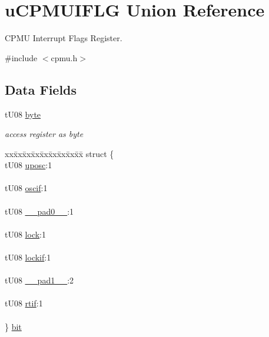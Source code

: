 \hypertarget{unionu_c_p_m_u_i_f_l_g}{}\section{u\+C\+P\+M\+U\+I\+F\+L\+G Union Reference}
\label{unionu_c_p_m_u_i_f_l_g}


C\+P\+M\+U Interrupt Flags Register.  




{\ttfamily \#include $<$cpmu.\+h$>$}

\subsection*{Data Fields}
\begin{DoxyCompactItemize}
\item 
\hypertarget{unionu_c_p_m_u_i_f_l_g_aba308d63db050aed25cfd36c37e41ad4}{}t\+U08 \hyperlink{unionu_c_p_m_u_i_f_l_g_aba308d63db050aed25cfd36c37e41ad4}{byte}\label{unionu_c_p_m_u_i_f_l_g_aba308d63db050aed25cfd36c37e41ad4}

\begin{DoxyCompactList}\small\item\em access register as byte \end{DoxyCompactList}\item 
\hypertarget{unionu_c_p_m_u_i_f_l_g_a461897484614bfd4423042d8157d629d}{}\begin{tabbing}
xx\=xx\=xx\=xx\=xx\=xx\=xx\=xx\=xx\=\kill
struct \{\\
\>tU08 \hyperlink{unionu_c_p_m_u_i_f_l_g_a7e6f05478ab661194263d568807ba978}{uposc}:1\\
\>\\
\>tU08 \hyperlink{unionu_c_p_m_u_i_f_l_g_af5df32b1813ef32f35dc7cb0efcfe78c}{oscif}:1\\
\>\\
\>tU08 \hyperlink{unionu_c_p_m_u_i_f_l_g_aa3e5250d311ceb1525f9adf38f0d7982}{\_\_pad0\_\_}:1\\
\>\\
\>tU08 \hyperlink{unionu_c_p_m_u_i_f_l_g_ad28294208214525c2fd2825248ec58dd}{lock}:1\\
\>\\
\>tU08 \hyperlink{unionu_c_p_m_u_i_f_l_g_a758567bfe040656a128d0a243b6f03a0}{lockif}:1\\
\>\\
\>tU08 \hyperlink{unionu_c_p_m_u_i_f_l_g_a79a5f05caf4105fead38063726e0f288}{\_\_pad1\_\_}:2\\
\>\\
\>tU08 \hyperlink{unionu_c_p_m_u_i_f_l_g_ac4d22087e0325f5d9674bbe0f19ca8a5}{rtif}:1\\
\>\\
\} \hyperlink{unionu_c_p_m_u_i_f_l_g_a461897484614bfd4423042d8157d629d}{bit}\label{unionu_c_p_m_u_i_f_l_g_a461897484614bfd4423042d8157d629d}
\\


\end{tabbing}
\end{DoxyCompactItemize}
